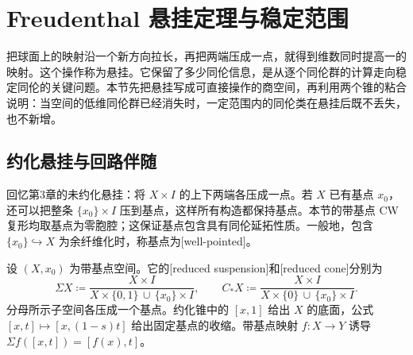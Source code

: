 
% 
% 
% 
% 
% 
% 
% 
% 

\section{Freudenthal 悬挂定理与稳定范围}
\label{g2:sec:0905}

把球面上的映射沿一个新方向拉长，再把两端压成一点，就得到维数同时提高一的映射。这个操作称为悬挂。它保留了多少同伦信息，是从逐个同伦群的计算走向稳定同伦的关键问题。本节先把悬挂写成可直接操作的商空间，再利用两个锥的粘合说明：当空间的低维同伦群已经消失时，一定范围内的同伦类在悬挂后既不丢失，也不新增。

\subsection{约化悬挂与回路伴随}
\label{g2:subsec:0905:01}
回忆第3章的未约化悬挂：将 \(X\times I\) 的上下两端各压成一点。若 \(X\) 已有基点 \(x_0\)，还可以把整条 \(\{x_0\}\times I\) 压到基点，这样所有构造都保持基点。本节的带基点 CW 复形均取基点为零胞腔；这保证基点包含具有同伦延拓性质。一般地，包含 \(\{x_0\}\hookrightarrow X\) 为余纤维化时，称基点为[well-pointed]。

\begin{definition}[约化悬挂与约化锥]\label{g2:def:reduced-suspension}
	设 \((X,x_0)\) 为带基点空间。它的[reduced suspension]和[reduced cone]分别为
	\[
		\Sigma X\coloneqq\frac{X\times I}{X\times\{0,1\}\,\cup\,\{x_0\}\times I},\qquad
		C_*X\coloneqq\frac{X\times I}{X\times\{0\}\,\cup\,\{x_0\}\times I}.
	\]
	分母所示子空间各压成一个基点。约化锥中的 \([x,1]\) 给出 \(X\) 的底面，公式 \([x,t]\mapsto[x,(1-s)t]\) 给出固定基点的收缩。带基点映射 \(f:X\rightarrow Y\) 诱导 \(\Sigma f([x,t])=[f(x),t]\)。
\end{definition}


